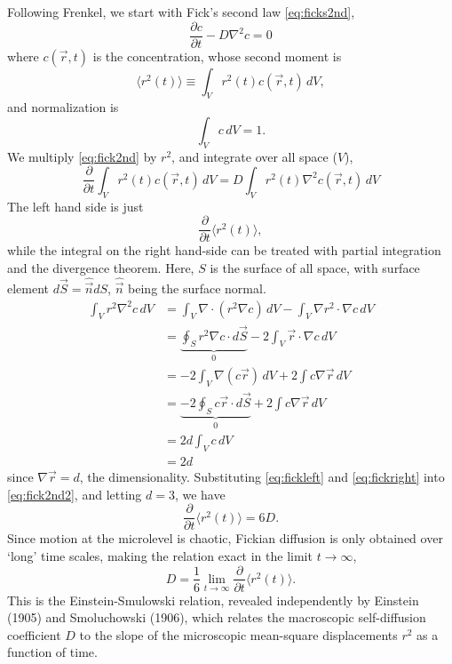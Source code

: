 \documentclass[11pt,bibliography=totoc,index=totoc]{scrbook}   %
\begin{document}
Following Frenkel\cite[78-79]{Frenkel:1996}, we start with Fick's second law \eqref{eq:ficks2nd}, 
\begin{equation}
    \frac{\partial c}{\partial t} - D\nabla^2c = 0
  \label{eq:fick2nd}
\end{equation}
where $c(\vec{r},t)$ is the concentration, whose second moment is
\begin{equation}
    \langle r^2(t)\rangle \equiv \int_V r^2(t) c(\vec{r},t) \,dV,
  \label{eq:secondmom}
\end{equation}
and normalization is
\begin{equation}
    \int_V c\,dV = 1.
  \label{eq:cnorm}
\end{equation}
We multiply \eqref{eq:fick2nd} by $r^2$, and integrate over all space ($V$),
\begin{equation}
    \frac{\partial}{\partial t} \int_V r^2(t) c(\vec{r},t)\,dV = D\int_V r^2(t) \nabla^2 c(\vec{r},t) \,dV
  \label{eq:fick2nd2}
\end{equation}
The left hand side is just
\begin{equation}
  \frac{\partial}{\partial t} \langle r^2(t)\rangle,
  \label{eq:fickleft}
\end{equation}
while the integral on the right hand-side can be treated with partial integration and the divergence theorem.
Here, $S$ is the surface of all space, with surface element $d\vec{S}=\hat{\vec{n}}dS$, $\hat{\vec{n}}$ being the surface normal.
\begin{align}
  \int_V r^2 \nabla^2 c \,dV &= \int_V \nabla\cdot (r^2\nabla c) \,dV - \int_V \nabla r^2 \cdot \nabla c \, dV \nonumber\\
  &= \underbrace{\oint_S r^2 \nabla c \cdot d\vec{S}}_0 - 2\int_V \vec{r}\cdot\nabla c \,dV \nonumber\\
  &= -2\int_V \nabla (c\vec{r}) \,dV + 2 \int c \nabla \vec{r} \, dV \nonumber\\
  &= \underbrace{-2\oint_S c\vec{r}\cdot d\vec{S}}_0 + 2 \int c \nabla \vec{r} \, dV \nonumber\\
  &= 2d\int_V c \, dV \nonumber\\
  &= 2d \label{eq:fickright}
\end{align}
since $\nabla\vec{r} = d$, the dimensionality. 
Substituting \eqref{eq:fickleft} and \eqref{eq:fickright} into \eqref{eq:fick2nd2}, and letting $d=3$, we have
\begin{equation}
  \frac{\partial}{\partial t} \langle r^2(t)\rangle = 6D.
\end{equation}
Since motion at the microlevel is chaotic, Fickian diffusion is only obtained over `long' time scales, 
making the relation exact in the limit $t\to\infty$,
\begin{equation}
    D = \frac{1}{6}\lim_{t\to\infty} \frac{\partial}{\partial t} \langle r^2(t)\rangle.
\end{equation}
This is the Einstein-Smulowski relation, revealed independently by Einstein (1905)\cite{Einstein:1905}
and Smoluchowski (1906),\cite{Smoluchowski:1906}
which relates the macroscopic self-diffusion coefficient $D$ to the slope of the microscopic mean-square displacements $r^2$ as a function of time.
\end{document}
